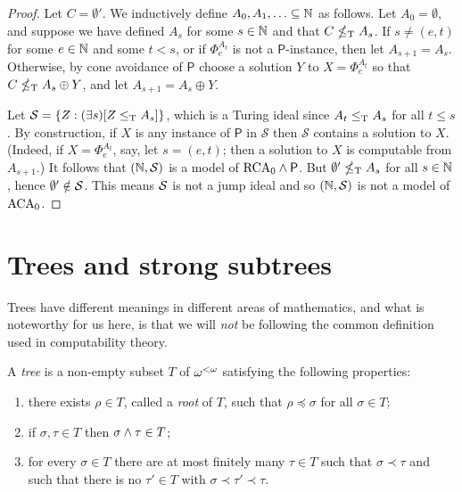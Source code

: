 \begin{proof}
	Let $C = \emptyset'$. We inductively define $A_0,A_1,\ldots \subseteq \mathbb{N}$ as follows. Let $A_0 = \emptyset$, and suppose we have defined $A_s$ for some $s \in \mathbb{N}$ and that $C \nleq_{\text{\upshape T}} A_s$. If $s \neq (e,t)$ for some $e \in \mathbb{N}$ and some $t < s$, or if $\Phi_e^{A_t}$ is not a $\mathsf{P}$-instance, then let $A_{s+1} = A_s$. Otherwise, by cone avoidance of $\mathsf{P}$ choose a solution $Y$ to $X = \Phi_e^{A_t}$ so that $C \nleq_{\text{\upshape T}} A_s \oplus Y$, and let $A_{s+1} = A_s \oplus Y$.
	
	Let $\mathcal{S} = \{ Z: (\exists s)[Z \leq_{\text{\upshape T}} A_s]\}$, which is a Turing ideal since $A_t \leq_{\text{\upshape T}} A_s$ for all $t \leq s$. By construction, if $X$ is any instance of $\mathsf{P}$ in $\mathcal{S}$ then $\mathcal{S}$ contains a solution to $X$. (Indeed, if $X = \Phi_e^{A_t}$, say, let $s = (e,t)$; then a solution to $X$ is computable from $A_{s+1}$.) It follows that $(\mathbb{N},\mathcal{S})$ is a model of $\mathrm{RCA}_0 \wedge \mathsf{P}$. But $\emptyset' \nleq_{\text{\upshape T}} A_s$ for all $s \in \mathbb{N}$, hence $\emptyset' \notin \mathcal{S}$. This means $\mathcal{S}$ is not a jump ideal and so $(\mathbb{N},\mathcal{S})$ is not a model of $\mathrm{ACA}_0$.
\end{proof}

\section{Trees and strong subtrees}\label{sec:bkg_trees}

Trees have different meanings in different areas of mathematics, and what is noteworthy for us here, is that we will \emph{not} be following the common definition used in computability theory.

\begin{definition}\label{def:trees}
	A \emph{tree} is a non-empty subset $T$ of ${\omega^{<\omega}}$ 	satisfying the following properties:
	\begin{enumerate}
		\item there exists $\rho \in T$, called a \emph{root} of $T$, such that $\rho \preceq \sigma$ for all $\sigma \in T$;
		\item if $\sigma,\tau \in T$ then $\sigma \wedge \tau \in T$;
		\item for every $\sigma \in T$ there are at most finitely many $\tau \in T$ such that $\sigma \prec \tau$ and such that there is no $\tau' \in T$ with $\sigma \prec \tau' \prec \tau$.
	\end{enumerate}
\end{definition}

